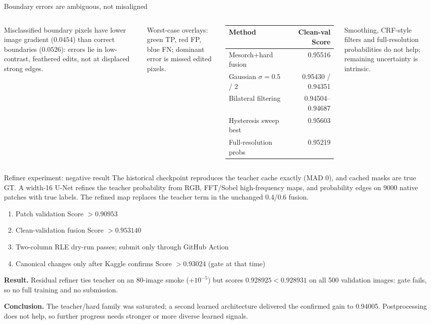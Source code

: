 \documentclass[10pt]{beamer}
\begin{document}
\begin{frame}{Boundary errors are ambiguous, not misaligned}
\small
\begin{columns}[T]
\footnotesize
Misclassified boundary pixels have lower image gradient ($0.0454$) than correct boundaries ($0.0526$): errors lie in low-contrast, feathered edits, not at displaced strong edges.
\vspace{.1cm}

Worst-case overlays: green TP, red FP, blue FN; dominant error is missed edited pixels.
\footnotesize
\begin{tabular}{lr}
\toprule Method & Clean-val Score \\
\midrule
Mesorch+hard fusion & 0.95516 \\
Gaussian $\sigma=0.5$ / $2$ & 0.95430 / 0.94351 \\
Bilateral filtering & 0.94504--0.94687 \\
Hysteresis sweep best & 0.95603 \\
Full-resolution probs & 0.95219 \\
\bottomrule
\end{tabular}
\vspace{.1cm}
Smoothing, CRF-style filters and full-resolution probabilities do not help; remaining uncertainty is intrinsic.
\end{columns}
\end{frame}

\begin{frame}{Refiner experiment: negative result}
\small
The historical checkpoint reproduces the teacher cache exactly (MAD 0), and cached masks are true GT. A width-16 U-Net refines the teacher probability from RGB, FFT/Sobel high-frequency maps, and probability edges on 9000 native patches with true labels. The refined map replaces the teacher term in the unchanged 0.4/0.6 fusion.
\vspace{.2cm}
\begin{enumerate}
\item Patch validation Score $> 0.90953$
\item Clean-validation fusion Score $> 0.953140$
\item Two-column RLE dry-run passes; submit only through GitHub Action
\item Canonical changes only after Kaggle confirms Score $> 0.93024$ (gate at that time)
\end{enumerate}
\vspace{.1cm}
\textbf{Result.} Residual refiner ties teacher on an 80-image smoke ($+10^{-5}$) but scores $0.928925 < 0.928931$ on all 500 validation images: gate fails, so no full training and no submission.

\vspace{.1cm}
\textbf{Conclusion.} The teacher/hard family was saturated; a second learned architecture delivered the confirmed gain to 0.94005. Postprocessing does not help, so further progress needs stronger or more diverse learned signals.
\end{frame}
\end{document}
